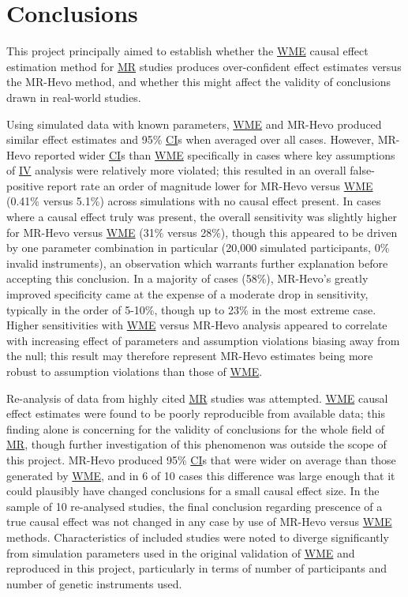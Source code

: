 \documentclass[
]{article}
\begin{document}
\section{Conclusions}\label{conclusions-1}

This project principally aimed to establish whether the \hyperref[acronyms_WME]{WME} causal effect estimation method for \hyperref[acronyms_MR]{MR} studies produces over-confident effect estimates versus the MR-Hevo method, and whether this might affect the validity of conclusions drawn in real-world studies.

Using simulated data with known parameters, \hyperref[acronyms_WME]{WME} and MR-Hevo produced similar effect estimates and 95\% \hyperref[acronyms_CI]{CI}s when averaged over all cases. However, MR-Hevo reported wider \hyperref[acronyms_CI]{CI}s than \hyperref[acronyms_WME]{WME} specifically in cases where key assumptions of \hyperref[acronyms_IV]{IV} analysis were relatively more violated; this resulted in an overall false-positive report rate an order of magnitude lower for MR-Hevo versus \hyperref[acronyms_WME]{WME} (0.41\% versus 5.1\%) across simulations with no causal effect present. In cases where a causal effect truly was present, the overall sensitivity was slightly higher for MR-Hevo versus \hyperref[acronyms_WME]{WME} (31\% versus 28\%), though this appeared to be driven by one parameter combination in particular (20,000 simulated participants, 0\% invalid instruments), an observation which warrants further explanation before accepting this conclusion. In a majority of cases (58\%), MR-Hevo's greatly improved specificity came at the expense of a moderate drop in sensitivity, typically in the order of 5-10\%, though up to 23\% in the most extreme case. Higher sensitivities with \hyperref[acronyms_WME]{WME} versus MR-Hevo analysis appeared to correlate with increasing effect of parameters and assumption violations biasing away from the null; this result may therefore represent MR-Hevo estimates being more robust to assumption violations than those of \hyperref[acronyms_WME]{WME}.

Re-analysis of data from highly cited \hyperref[acronyms_MR]{MR} studies was attempted. \hyperref[acronyms_WME]{WME} causal effect estimates were found to be poorly reproducible from available data; this finding alone is concerning for the validity of conclusions for the whole field of \hyperref[acronyms_MR]{MR}, though further investigation of this phenomenon was outside the scope of this project. MR-Hevo produced 95\% \hyperref[acronyms_CI]{CI}s that were wider on average than those generated by \hyperref[acronyms_WME]{WME}, and in 6 of 10 cases this difference was large enough that it could plausibly have changed conclusions for a small causal effect size. In the sample of 10 re-analysed studies, the final conclusion regarding prescence of a true causal effect was not changed in any case by use of MR-Hevo versus \hyperref[acronyms_WME]{WME} methods. Characteristics of included studies were noted to diverge significantly from simulation parameters used in the original validation of \hyperref[acronyms_WME]{WME} and reproduced in this project, particularly in terms of number of participants and number of genetic instruments used.
\end{document}
